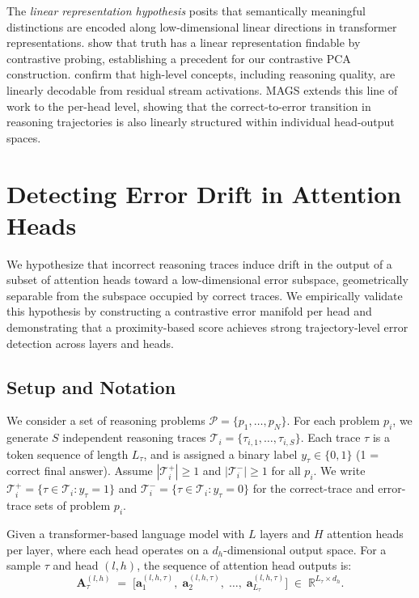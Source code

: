 \documentclass{article}
\newcommand{\R}{\mathbb{R}}
\newcommand{\ba}{\bm{a}}
\begin{document}
The \emph{linear representation hypothesis} \citep{park2023linear} posits that semantically meaningful distinctions are encoded along low-dimensional linear directions in transformer representations. \citet{burns2023ccs} show that truth has a linear representation findable by contrastive probing, establishing a precedent for our contrastive PCA construction. \citet{zou2023representation} confirm that high-level concepts, including reasoning quality, are linearly decodable from residual stream activations. MAGS extends this line of work to the per-head level, showing that the correct-to-error transition in reasoning trajectories is also linearly 
structured within individual head-output spaces.

\section{Detecting Error Drift in Attention Heads}
\label{sec:hypothesis}
 We hypothesize that incorrect reasoning traces induce drift in the output of a subset of attention heads toward a low-dimensional error subspace, geometrically separable from the subspace occupied by correct traces. We empirically validate this hypothesis by constructing a contrastive error manifold per head and demonstrating that a proximity-based score achieves strong trajectory-level error detection across layers and heads.
\subsection{Setup and Notation}

We consider a set of reasoning problems $\mathcal{P} = \{p_1, \ldots, p_N\}$. For each problem $p_i$, we generate $S$ independent reasoning traces $\mathcal{T}_i = \{\tau_{i,1}, \ldots, \tau_{i,S}\}$. Each trace $\tau$ is a token sequence of length $L_\tau$, and is assigned a binary label $y_\tau \in \{0, 1\}$ (1 = correct final answer). Assume $|\mathcal{T}_i^+| \geq 1$ and $|\mathcal{T}_i^-| \geq 1$ for all $p_i$. We write $\mathcal{T}_i^+ = \{\tau \in \mathcal{T}_i : y_\tau = 1\}$ and $\mathcal{T}_i^- = \{\tau \in \mathcal{T}_i : y_\tau = 0\}$ for the correct-trace and error-trace sets of problem $p_i$.

Given a transformer-based language model with $L$ layers and $H$ attention heads per layer, where each head operates on a $d_h$-dimensional output space. For a sample $\tau$ and head $(l,h)$, the sequence of attention head outputs is:
\begin{equation}
    \mathbf{A}_\tau^{(l,h)} \;=\;
    \bigl[\ba_1^{(l,h,\tau)},\; \ba_2^{(l,h,\tau)},\; \ldots,\;
    \ba_{L_\tau}^{(l,h,\tau)}\bigr]
    \;\in\; \R^{L_\tau \times d_h}.
\end{equation}
\end{document}
